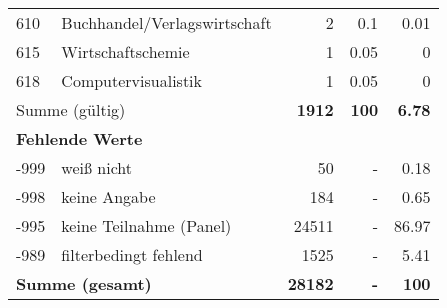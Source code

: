\begin{longtable}{lXrrr}
        610 & \multicolumn{1}{X}{Buchhandel/Verlagswirtschaft} & %
          \num{2} &
          \num[round-mode=places,round-precision=2]{0.1} &
          \num[round-mode=places,round-precision=2]{0.01} \\

        615 & \multicolumn{1}{X}{Wirtschaftschemie} & %
          \num{1} &
          \num[round-mode=places,round-precision=2]{0.05} &
          \num[round-mode=places,round-precision=2]{0} \\

        618 & \multicolumn{1}{X}{Computervisualistik} & %
          \num{1} &
          \num[round-mode=places,round-precision=2]{0.05} &
          \num[round-mode=places,round-precision=2]{0} \\

     \midrule
     \multicolumn{2}{l}{Summe (gültig)} &
       \textbf{\num{1912}} &
     \textbf{\num{100}} &
       \textbf{\num[round-mode=places,round-precision=2]{6.78}} \\
     \multicolumn{5}{l}{\textbf{Fehlende Werte}}\\
       -999 &
       weiß nicht &
         \num{50} &
        - &
         \num[round-mode=places,round-precision=2]{0.18} \\
       -998 &
       keine Angabe &
         \num{184} &
        - &
         \num[round-mode=places,round-precision=2]{0.65} \\
       -995 &
       keine Teilnahme (Panel) &
         \num{24511} &
        - &
         \num[round-mode=places,round-precision=2]{86.97} \\
       -989 &
       filterbedingt fehlend &
         \num{1525} &
        - &
         \num[round-mode=places,round-precision=2]{5.41} \\
     \midrule
     \multicolumn{2}{l}{\textbf{Summe (gesamt)}} &
          \textbf{\num{28182}} &
        \textbf{-} &
        \textbf{\num{100}} \\
     \bottomrule
     \end{longtable}
     
